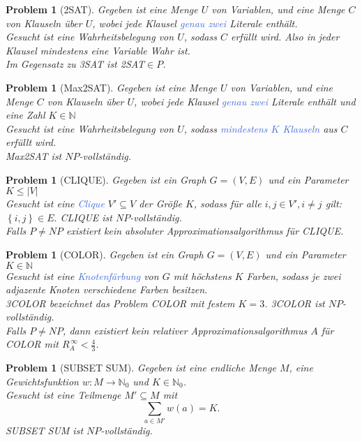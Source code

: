 \documentclass[11pt]{scrartcl}
\newcommand{\tcol}[1]{\textcolor{RoyalBlue}{#1}}
\newcommand{\set}[1]{\left\lbrace #1\right\rbrace}
\theoremstyle{break}
\newtheorem{prob}[satz]{Problem}
\begin{document}
    \begin{prob}[2SAT]
        Gegeben ist eine Menge $U$ von Variablen, und eine Menge $C$ von Klauseln über $U$, wobei jede Klausel \tcol{genau zwei} Literale enthält.\\
        Gesucht ist eine Wahrheitsbelegung von $U$, sodass $C$ erfüllt wird.
        Also in jeder Klausel mindestens eine Variable Wahr ist.\\
        Im Gegensatz zu 3SAT ist 2SAT$\in P$.
    \end{prob}

    \begin{prob}[Max2SAT]
        Gegeben ist eine Menge $U$ von Variablen, und eine Menge $C$ von Klauseln über $U$, wobei jede Klausel \tcol{genau zwei} Literale enthält und eine Zahl $K\in\mathbb{N}$\\
        Gesucht ist eine Wahrheitsbelegung von $U$, sodass \tcol{mindestens $K$ Klauseln} aus $C$ erfüllt wird.\\
        Max2SAT ist $NP$-vollständig.
    \end{prob}

    \begin{prob}[CLIQUE]
        Gegeben ist ein Graph $G=(V,E)$ und ein Parameter $K\leq |V|$\\
        Gesucht ist eine \tcol{Clique} $V'\subseteq V$ der Größe $K$, sodass für alle $i,j\in V', i\neq j$ gilt: $\set{i,j}\in E.$
        CLIQUE ist $NP$-vollständig.\\
        Falls $P\neq NP$ existiert kein absoluter Approximationsalgorithmus für CLIQUE\@.
    \end{prob}

    \begin{prob}[COLOR]
        Gegeben ist ein Graph $G=(V,E)$ und ein Parameter $K\in\mathbb{N}$\\
        Gesucht ist eine \tcol{Knotenfärbung} von $G$ mit höchstens $K$ Farben, sodass je zwei adjazente Knoten verschiedene Farben besitzen.\\
        3COLOR bezeichnet das Problem COLOR mit festem $K=3$.
        3COLOR ist $NP$-vollständig.\\
        Falls $P\neq NP$, dann existiert kein relativer Approximationsalgorithmus $A$ für COLOR mit $R^{\,\infty}_A<\frac{4}{3}$.
    \end{prob}

    \begin{prob}[SUBSET SUM]
        Gegeben ist eine endliche Menge $M$, eine Gewichtsfunktion $w\colon M\to\mathbb{N}_0$ und $K\in\mathbb{N}_0$.\\
        Gesucht ist eine Teilmenge $M'\subseteq M$ mit
        \[\sum_{a\in M'}w(a)=K.\]
        SUBSET SUM ist $NP$-vollständig.
    \end{prob}
\end{document}
